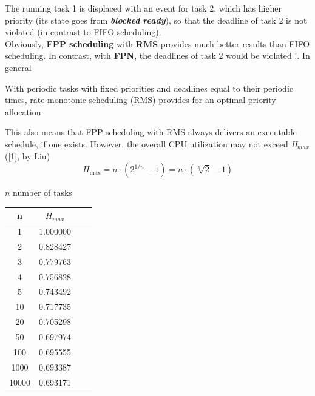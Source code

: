 The running task 1 is displaced with an event for task 2, which has higher priority (its state goes from \textbf{\textit{blocked}}  \textbf{\textit{ready}}), so that the deadline of task 2 is not violated (in contrast to FIFO scheduling).\\

Obviously,\textbf{ FPP scheduling} with \textbf{RMS} provides much better results than FIFO scheduling. In contrast, with \textbf{FPN}, the deadlines of task 2 would be violated !. In general\\

\begin{tcolorbox}[colback=blue!5!white,colframe=blue!75!black]
 	With periodic tasks with fixed priorities and deadlines equal to their periodic times, rate-monotonic scheduling (RMS) provides for an optimal priority allocation.
\end{tcolorbox}

This also means that FPP scheduling with RMS always delivers an executable schedule, if one exists. However, the overall CPU utilization may not exceed \textit{H${}_{max}$ }([1], by Liu)\\

\begin{equation}
	H_{\max } =n\cdot \left(2^{1/n} -1\right)=n\cdot \left(\sqrt[{n}]{2} -1\right) 
\label{EQ }
\end{equation}

$n$ number of tasks\\

\begin{table}[h!]
\setlength{\tabcolsep}{10pt} %
\renewcommand{\arraystretch}{1.5} %
\small
\centering
 \begin{tabular}{|c|c|c|c|} 
 \hline
 \textbf{n} & \textbf{$H_{max}$} \\ [0.1ex] \hline
1 & 1.000000 \\ \hline
2 & 0.828427 \\ \hline
3 & 0.779763 \\  \hline
4 & 0.756828 \\ \hline
5 & 0.743492 \\ \hline
10 & 0.717735 \\ \hline 
20 & 0.705298 \\ \hline 
50 & 0.697974 \\ \hline 
100 & 0.695555 \\ \hline 
1000 & 0.693387 \\ \hline 
10000 & 0.693171 \\ \hline 
 \end{tabular}
 \label{}
\end{table}

